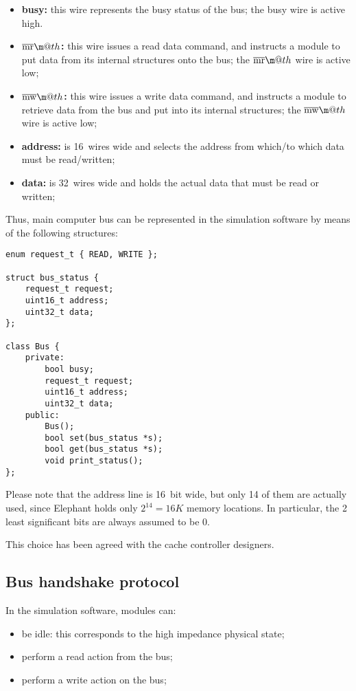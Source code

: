 \documentclass[a4paper,12pt]{article}
\makeatletter
\newcommand*{\textoverline}[1]{$\overline{\hbox{#1}}\m@th$}
\newcommand{\memoryname}{Elephant}
\makeatother
\begin{document}
\begin{itemize}
  \item \textbf{busy:} this wire represents the busy status of the bus; the busy wire is active high.
  \item \textbf{\textoverline{mr}:} this wire issues a read data command, and instructs a module to put data from its internal structures onto the bus; the \textoverline{mr} wire is active low;
  \item \textbf{\textoverline{mw}:} this wire issues a write data command, and instructs a module to retrieve data from the bus and put into its internal structures; the \textoverline{mw} wire is active low;
  \item \textbf{address:} is 16~wires wide and selects the address from which/to which data must be read/written;
  \item \textbf{data:} is 32~wires wide and holds the actual data that must be read or written;
\end{itemize}

Thus, main computer bus can be represented in the simulation software by means of the following structures:

\begin{verbatim}
enum request_t { READ, WRITE };

struct bus_status {
    request_t request;
    uint16_t address;
    uint32_t data;
};

class Bus {
    private:
        bool busy;
        request_t request;
        uint16_t address;
        uint32_t data;
    public:
        Bus();
        bool set(bus_status *s);
        bool get(bus_status *s);
        void print_status();
};
\end{verbatim}

Please note that the address line is 16~bit wide, but only 14 of them are actually used, since \memoryname{} holds only $2^{14} = 16K$ memory locations.
In particular, the 2 least significant bits are always assumed to be 0.

This choice has been agreed with the cache controller designers.

\subsection{Bus handshake protocol}
In the simulation software, modules can:
\begin{itemize}
  \item be idle: this corresponds to the high impedance physical state;
  \item perform a read action from the bus;
  \item perform a write action on the bus;
\end{itemize}
\end{document}
